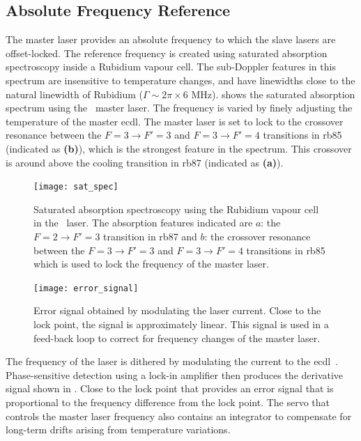 \subsection{Absolute Frequency Reference}\label{subsec:muquans_master}
The master laser provides an absolute frequency to which the slave
lasers are offset-locked. The reference frequency is created using 
saturated absorption spectroscopy inside a Rubidium vapour cell. The sub-Doppler
features in this spectrum are insensitive to temperature changes, and 
have linewidths close to the natural linewidth of
Rubidium (\(\Gamma \sim 2\pi \times 6\) MHz). 
shows the saturated absorption spectrum using the \Muquans\ master laser. The frequency is varied
by finely adjusting the temperature of the master \ac{ecdl}. The
master laser is set to lock to the crossover resonance between the \(F = 3
\rightarrow F' = 3\) and \(F = 3 \rightarrow F' = 4 \) transitions in \ac{rb85}
(indicated as \textbf{(b)}), which is the strongest feature in the
spectrum. This crossover is around  above the cooling
transition in \ac{rb87} (indicated as \textbf{(a)}).
\begin{figure}[!htbp]
	\texttt{[image: sat\_spec]}
	\caption[Saturated absorption spectroscopy of the \\Muquans\ master laser.]{Saturated absorption spectroscopy using the Rubidium vapour cell in the \Muquans\ laser. The absorption features indicated are \(a\): the \(F = 2 \rightarrow F' = 3\) transition in \ac{rb87} and \(b\): the crossover resonance between the \(F = 3 \rightarrow F' = 3\) and \(F = 3 \rightarrow F' = 4 \) transitions in \ac{rb85} which is used to lock the frequency of the master laser.}\label{fig:muquans_satspec}
\end{figure}
\begin{figure}[!htbp]
	\texttt{[image: error\_signal]}
	\caption[Error Signal for the \Muquans\ master servo.]{Error signal obtained by modulating the laser current. Close to the lock point, the signal is approximately linear. This signal is used in a feed-back loop to correct for frequency changes of the master laser.}\label{fig:muquans_error_signal}
\end{figure}
The frequency of the laser is dithered by modulating the current to
the \ac{ecdl}~\cite{Supplee1994}. Phase-sensitive detection using a
lock-in amplifier then produces the derivative signal shown in
. Close to the lock point that
provides an error signal that is
proportional to the frequency difference from the lock point. The servo that controls the master laser frequency also contains
an integrator to compensate for long-term drifts arising from temperature
variations.

